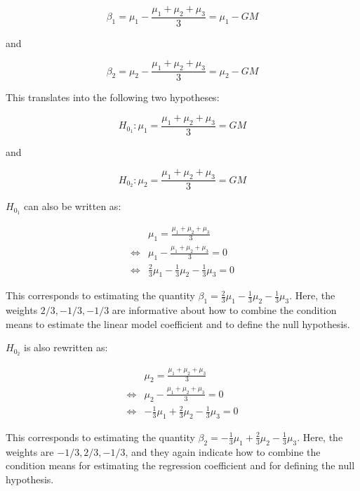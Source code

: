 \documentclass[12pt,]{krantz}
\theoremstyle{definition}
\theoremstyle{definition}
\theoremstyle{definition}
\theoremstyle{remark}
\begin{document}
\begin{equation}
\beta_1 = \mu_1 - \frac{\mu_1+\mu_2+\mu_3}{3} = \mu_1 - GM
\end{equation}

\noindent
and

\begin{equation}
\beta_2 = \mu_2 - \frac{\mu_1+\mu_2+\mu_3}{3} = \mu_2 - GM
\end{equation}

This translates into the following two hypotheses:

\begin{equation}
H_{0_1}: \mu_1 = \frac{\mu_1+\mu_2+\mu_3}{3} = GM
\end{equation}

\noindent
and

\begin{equation}
H_{0_2}: \mu_2 = \frac{\mu_1+\mu_2+\mu_3}{3} = GM
\end{equation}

\(H_{0_1}\) can also be written as:

\begin{align} \label{h01}
& \mu_1 =\frac{\mu_1+\mu_2+\mu_3}{3}\\
\Leftrightarrow & \mu_1 - \frac{\mu_1+\mu_2+\mu_3}{3} = 0\\
\Leftrightarrow & \frac{2}{3} \mu_1 - \frac{1}{3}\mu_2 - \frac{1}{3}\mu_3 = 0
\end{align}

\noindent
This corresponds to estimating the quantity \(\beta_1 = \frac{2}{3} \mu_1 - \frac{1}{3}\mu_2 - \frac{1}{3}\mu_3\).
Here, the weights \(2/3, -1/3, -1/3\) are informative about how to combine the condition means to estimate the linear model coefficient and to define the null hypothesis.

\(H_{0_2}\) is also rewritten as:

\begin{align}\label{h02}
&  \mu_2 = \frac{\mu_1+\mu_2+\mu_3}{3}\\
\Leftrightarrow & \mu_2 - \frac{\mu_1+\mu_2+\mu_3}{3} = 0 \\
\Leftrightarrow & -\frac{1}{3}\mu_1 + \frac{2}{3} \mu_2 - \frac{1}{3} \mu_3 = 0
\end{align}

\noindent
This corresponds to estimating the quantity \(\beta_2 = -\frac{1}{3}\mu_1 + \frac{2}{3} \mu_2 - \frac{1}{3} \mu_3\).
Here, the weights are \(-1/3, 2/3, -1/3\), and they again indicate how to combine the condition means for estimating the regression coefficient and for defining the null hypothesis.
\end{document}
